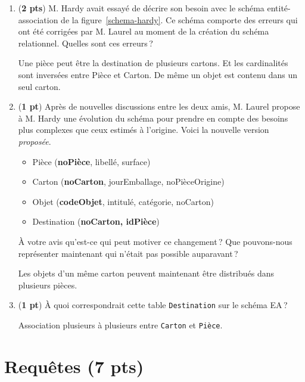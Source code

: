 \begin{enumerate}
    \item ({\bf 2 pts}) M. Hardy avait essayé de décrire son besoin avec le
      schéma entité-association de la figure~\ref{schema-hardy}.
     Ce schéma comporte des erreurs qui ont été corrigées 
       par M. Laurel
       au moment de la création du schéma relationnel. Quelles
       sont ces erreurs\,?

\begin{solution}
Une pièce peut être la destination de plusieurs
cartons. Et les cardinalités sont inversées entre Pièce et Carton.
De même un
objet est contenu dans un seul carton.
\end{solution}
 
 \item ({\bf 1 pt}) Après de nouvelles discussions entre les deux amis, M. Laurel 
        propose à M. Hardy une évolution du schéma pour prendre en compte
        des besoins plus complexes que ceux estimés à l'origine. Voici
        la nouvelle version \emph{proposée}.
        
      \begin{itemize}
        \item Pièce (\textbf{noPièce}, libellé, surface)
        \item Carton (\textbf{noCarton}, jourEmballage, noPièceOrigine)
        \item  Objet (\textbf{codeObjet}, intitulé, catégorie,
                     noCarton)
        \item Destination (\textbf{noCarton, idPièce})
       \end{itemize}
  À votre avis qu'est-ce qui peut motiver ce changement\,? Que pouvons-nous
 représenter maintenant qui n'était pas possible auparavant\,?
 
\begin{solution}
 Les objets d'un même carton peuvent maintenant être distribués dans plusieurs pièces.
\end{solution}
 

 \item ({\bf 1 pt}) À quoi correspondrait cette table \texttt{Destination} sur le schéma
 EA\,?

\begin{solution}
Association plusieurs à plusieurs entre \texttt{Carton} et \texttt{Pièce}.
\end{solution}
\end{enumerate}

\section{Requêtes (7 pts)}

